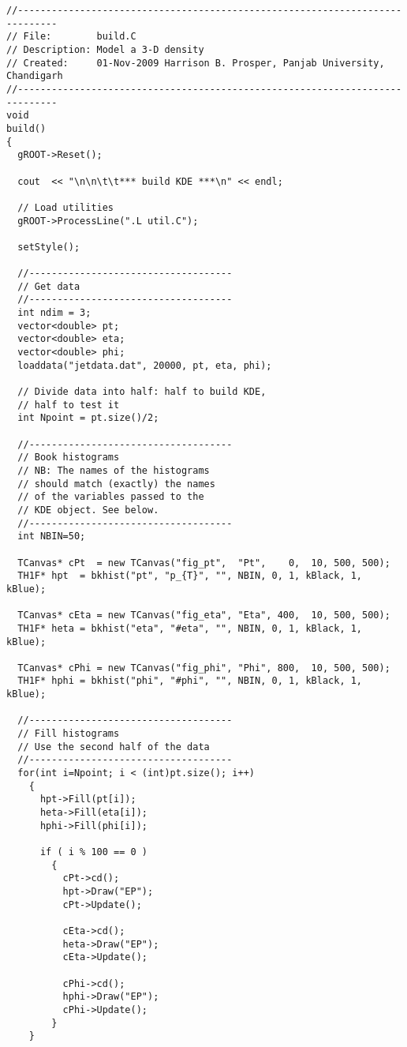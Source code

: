 \footnotesize\begin{verbatim}//-----------------------------------------------------------------------------
// File:        build.C
// Description: Model a 3-D density
// Created:     01-Nov-2009 Harrison B. Prosper, Panjab University, Chandigarh
//-----------------------------------------------------------------------------
void 
build()
{
  gROOT->Reset();

  cout  << "\n\n\t\t*** build KDE ***\n" << endl;
 
  // Load utilities
  gROOT->ProcessLine(".L util.C");

  setStyle();

  //------------------------------------
  // Get data
  //------------------------------------
  int ndim = 3;
  vector<double> pt;
  vector<double> eta;
  vector<double> phi;
  loaddata("jetdata.dat", 20000, pt, eta, phi);

  // Divide data into half: half to build KDE,
  // half to test it
  int Npoint = pt.size()/2;
  
  //------------------------------------
  // Book histograms
  // NB: The names of the histograms
  // should match (exactly) the names
  // of the variables passed to the
  // KDE object. See below.
  //------------------------------------
  int NBIN=50;

  TCanvas* cPt  = new TCanvas("fig_pt",  "Pt",    0,  10, 500, 500);
  TH1F* hpt  = bkhist("pt", "p_{T}", "", NBIN, 0, 1, kBlack, 1, kBlue);

  TCanvas* cEta = new TCanvas("fig_eta", "Eta", 400,  10, 500, 500);
  TH1F* heta = bkhist("eta", "#eta", "", NBIN, 0, 1, kBlack, 1, kBlue);

  TCanvas* cPhi = new TCanvas("fig_phi", "Phi", 800,  10, 500, 500);
  TH1F* hphi = bkhist("phi", "#phi", "", NBIN, 0, 1, kBlack, 1, kBlue);

  //------------------------------------
  // Fill histograms
  // Use the second half of the data
  //------------------------------------
  for(int i=Npoint; i < (int)pt.size(); i++)
    {
      hpt->Fill(pt[i]);
      heta->Fill(eta[i]);
      hphi->Fill(phi[i]);

      if ( i % 100 == 0 )
        {
          cPt->cd();
          hpt->Draw("EP");
          cPt->Update();

          cEta->cd();
          heta->Draw("EP");
          cEta->Update();

          cPhi->cd();
          hphi->Draw("EP");
          cPhi->Update();
        }
    }


\end{verbatim}
